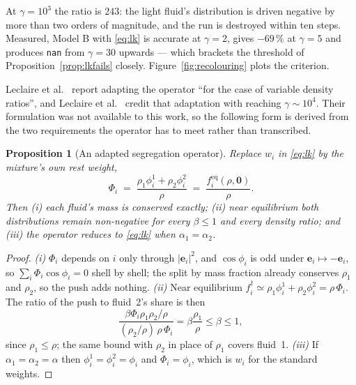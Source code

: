 \documentclass[11pt,a4paper]{article}
\theoremstyle{plain}
\newtheorem{proposition}{Proposition}
\theoremstyle{definition}
\newcommand{\ee}{\mathbf{e}}
\begin{document}
At $\gamma = 10^3$ the ratio is $243$: the light fluid's distribution is driven
negative by more than two orders of magnitude, and the run is destroyed within
ten steps. Measured, Model B with \eqref{eq:lk} is accurate at $\gamma = 2$,
gives $-69\,\%$ at $\gamma = 5$ and produces \texttt{nan} from $\gamma = 30$
upwards --- which brackets the threshold of Proposition~\ref{prop:lkfails}
closely. Figure~\ref{fig:recolouring} plots the criterion.

Leclaire et al.~\cite{leclaire2012} report adapting the operator ``for the case
of variable density ratios'', and Leclaire et al.~\cite{leclaire2011} credit
that adaptation with reaching $\gamma \sim 10^4$. Their formulation was not
available to this work, so the following form is derived from the two
requirements the operator has to meet rather than transcribed.

\begin{proposition}[An adapted segregation operator]
\label{prop:adapted}
Replace $w_i$ in \eqref{eq:lk} by the mixture's own rest weight,
\begin{equation}
  \Phi_i \;=\; \frac{\rho_1 \phi_i^1 + \rho_2 \phi_i^2}{\rho}
  \;=\; \frac{f_i^{\mathrm{eq}}(\rho, \mathbf{0})}{\rho}.
  \label{eq:adapted}
\end{equation}
Then \emph{(i)} each fluid's mass is conserved exactly; \emph{(ii)} near
equilibrium both distributions remain non-negative for every $\beta \le 1$ and
every density ratio; and \emph{(iii)} the operator reduces to \eqref{eq:lk} when
$\alpha_1 = \alpha_2$.
\end{proposition}

\begin{proof}
\emph{(i)} $\Phi_i$ depends on $i$ only through $|\ee_i|^2$, and
$\cos\phi_i$ is odd under $\ee_i \mapsto -\ee_i$, so
$\sum_i \Phi_i \cos\phi_i = 0$ shell by shell; the split by mass fraction
already conserves $\rho_1$ and $\rho_2$, so the push adds nothing.
\emph{(ii)} Near equilibrium $f_i^\dagger \simeq \rho_1\phi_i^1 + \rho_2\phi_i^2
= \rho\,\Phi_i$. The ratio of the push to fluid~2's share is then
\begin{equation}
  \frac{\beta \Phi_i \rho_1\rho_2/\rho}{(\rho_2/\rho)\,\rho\,\Phi_i}
  = \beta\frac{\rho_1}{\rho} \le \beta \le 1,
\end{equation}
since $\rho_1 \le \rho$; the same bound with $\rho_2$ in place of $\rho_1$
covers fluid~1. \emph{(iii)} If $\alpha_1 = \alpha_2 = \alpha$ then
$\phi_i^1 = \phi_i^2 = \phi_i$ and $\Phi_i = \phi_i$, which is $w_i$ for the
standard weights. \qedhere
\end{proof}
\end{document}
